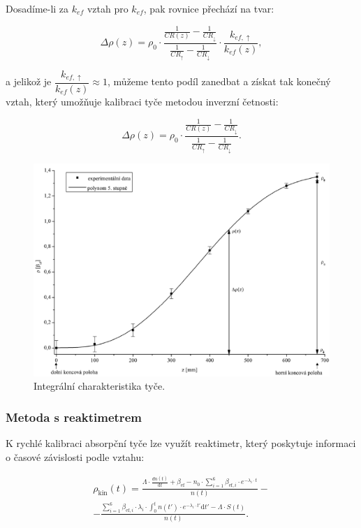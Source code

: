 Dosadíme-li za $ k_{ef} $ vztah pro $k_{ef}$, pak rovnice přechází na tvar:

\begin{equation*}
\Delta \rho(z) = \rho_0 \cdot \frac{\frac{1}{CR(z)} - \frac{1}{CR_\downarrow}}{\frac{1}{CR_\uparrow} - \frac{1}{CR_\downarrow}} \cdot \dfrac{k_{ef, \uparrow}}{k_{ef}(z)},
\end{equation*}

a jelikož je $\dfrac{k_{ef, \uparrow}}{k_{ef}(z)} \approx 1$, můžeme tento podíl zanedbat a získat tak konečný vztah, který umožňuje kalibraci tyče metodou inverzní četnosti:

\begin{equation}
\boxed{\Delta \rho(z) = \rho_0 \cdot \frac{\frac{1}{CR(z)} - \frac{1}{CR_\downarrow}}{\frac{1}{CR_\uparrow} - \frac{1}{CR_\downarrow}}.}
\end{equation}

\begin{figure}[H]
    \centering
    \includegraphics[scale=0.7]{img/CharakteristikaTyče.png}
    \caption{Integrální charakteristika tyče.}
    \label{fig:charakteristikaTyče}
\end{figure}

\subsubsection{Metoda s reaktimetrem}

K rychlé kalibraci absorpční tyče lze využít reaktimetr, který poskytuje informaci o časové závislosti podle vztahu:

\begin{equation} \label{rektimetr}
    \boxed{
    \begin{multlined}
    \rho_\text{kin} (t) = \frac{\Lambda \cdot \frac{dn(t)}{\text{d}t} + \beta_\text{ef}-n_\text{0}\cdot \sum_{i=1}^6\beta_{\text{ef},i}\cdot e^{-\lambda_i \cdot t}}{n(t)} -\\
    - \frac{\sum_{i=1}^6\beta_{\text{ef},i}\cdot \lambda_i \cdot \int_0^t n(t') \cdot e^{-\lambda_i \cdot t'} \text{d}t' -\Lambda \cdot S(t)}{n(t)}.
    \end{multlined}}
\end{equation}

